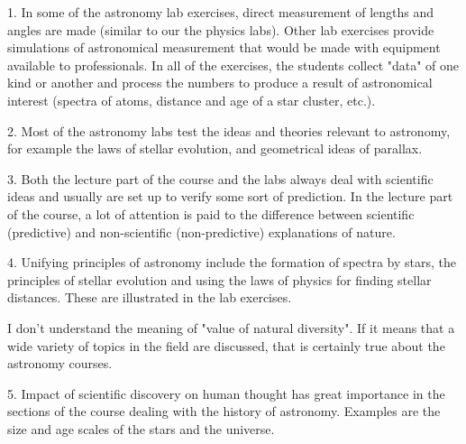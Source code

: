 1.  In some of the astronomy lab exercises, direct measurement of lengths and
angles are made (similar to our the physics labs).  Other lab exercises provide
simulations of astronomical measurement that would be made with equipment
available to professionals.  In all of the exercises, the students collect
"data" of one kind or another and process the numbers to produce a result of
astronomical interest (spectra of atoms, distance and age of a star cluster,
etc.).

2. Most of the astronomy labs test the ideas and theories relevant to
astronomy, for example the laws of stellar evolution, and geometrical ideas of
parallax.

3. Both the lecture part of the course and the labs always deal with scientific
ideas and usually are set up to verify some sort of prediction.  In the lecture
part of the course, a lot of attention is paid to the difference between
scientific (predictive) and non-scientific (non-predictive) explanations of
nature.

4.  Unifying principles of astronomy include the formation of spectra by stars,
the principles of stellar evolution and using the laws of physics for finding
stellar distances. These are illustrated in the lab exercises.

I don't understand the meaning of "value of natural diversity". If it means
that a wide variety of topics in the field are discussed, that is certainly
true about the astronomy courses.

5. Impact of scientific discovery on human thought has great importance in the
sections of the course dealing with the history of astronomy.  Examples are the
size and age scales of the stars and the universe.
